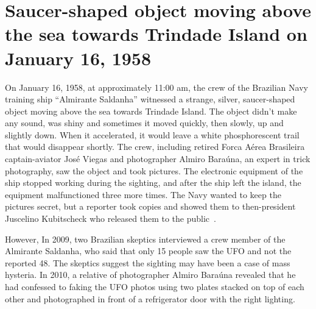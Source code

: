 \clearpage



\section{Saucer-shaped object moving above the sea towards Trindade Island on January 16, 1958}
\label{2023-UFO-part-History-photos-1958-tr}

On January 16, 1958, at approximately  11:00 am,  the crew of the Brazilian Navy training ship ``Almirante Saldanha'' witnessed a strange, silver,
saucer-shaped object moving above the sea towards Trindade Island.
The object didn't make any sound, was shiny and sometimes it moved quickly,
then slowly, up and slightly down.
When it accelerated, it would leave a white phosphorescent trail that would disappear shortly.
The crew, including retired Forca A\'erea Brasileira captain-aviator Jos\'e Viegas and photographer Almiro Bara\'una, an expert in trick photography,
saw the object and took pictures.
The electronic equipment of the ship stopped working during the sighting,
and after the ship left the island, the equipment malfunctioned three more times.
The Navy wanted to keep the pictures secret, but a reporter took copies and showed them to then-president Juscelino Kubitscheck
who released them to the public~\cite{Trinitate1958Jan}.

However, In 2009, two Brazilian skeptics interviewed a crew member of the Almirante Saldanha,
who said that only 15 people saw the UFO and not the reported 48. The skeptics suggest the sighting may have been a case of mass hysteria.
In 2010, a relative of photographer Almiro Bara\'una revealed that he had confessed to faking the UFO photos using two plates stacked on
top of each other and photographed in front of a refrigerator door with the right lighting.

\newpage

